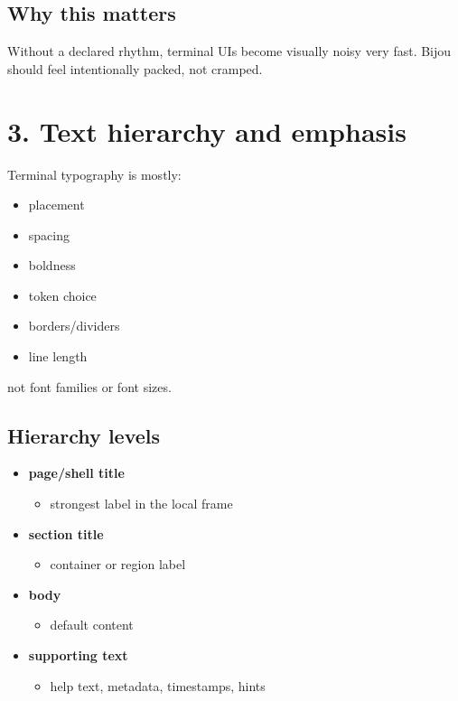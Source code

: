 \subsection{Why this matters}\label{record-021-why-this-matters}

Without a declared rhythm, terminal UIs become visually noisy very fast. Bijou should feel intentionally packed, not cramped.

\section{3. Text hierarchy and emphasis}\label{record-021-text-hierarchy-and-emphasis}

Terminal typography is mostly:

\begin{itemize}
\tightlist
\item
  placement
\item
  spacing
\item
  boldness
\item
  token choice
\item
  borders/dividers
\item
  line length
\end{itemize}

not font families or font sizes.

\subsection{Hierarchy levels}\label{record-021-hierarchy-levels}

\begin{itemize}
\tightlist
\item
  \textbf{page/shell title}

  \begin{itemize}
  \tightlist
  \item
    strongest label in the local frame
  \end{itemize}
\item
  \textbf{section title}

  \begin{itemize}
  \tightlist
  \item
    container or region label
  \end{itemize}
\item
  \textbf{body}

  \begin{itemize}
  \tightlist
  \item
    default content
  \end{itemize}
\item
  \textbf{supporting text}

  \begin{itemize}
  \tightlist
  \item
    help text, metadata, timestamps, hints
  \end{itemize}
\end{itemize}

